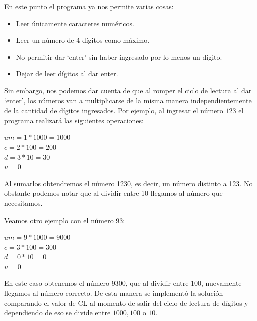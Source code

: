 \documentclass[letter,12 pt,titlepage]{article}
\begin{document}
    En este punto el programa ya nos permite varias cosas:
    \begin{itemize}
        \item Leer únicamente caracteres numéricos.
        \item Leer un número de 4 dígitos como máximo.
        \item No permitir dar `enter' sin haber ingresado por lo menos un dígito.
        \item Dejar de leer dígitos al dar enter.
    \end{itemize}

    Sin embargo, nos podemos dar cuenta de que al romper el ciclo de lectura al dar `enter', los números van a multiplicarse de la misma manera independientemente de la cantidad de dígitos ingresados. Por ejemplo, al ingresar el número $123$ el programa realizará las siguientes operaciones:

    \begin{center}
    \begin{minipage}{0.3\linewidth}
        \begin{flushright}
        $um = 1 * 1000 = 1000$\\
        $ c = 2 *  100 =  200$\\
        $ d = 3 *   10 =   30$\\
        $ u = 0 $
        \end{flushright}
    \end{minipage}
    \end{center}

    Al sumarlos obtendremos el número 1230, es decir, un número distinto a 123. No obstante podemos notar que al dividir entre 10 llegamos al número que necesitamos.

    Veamos otro ejemplo con el número 93:

    \begin{center}
    \begin{minipage}{0.3\linewidth}
        \begin{flushright}
        $um = 9 * 1000 = 9000$\\
        $ c = 3 *  100 =  300$\\
        $ d = 0 *   10 =   0$\\
        $ u = 0 $
        \end{flushright}
    \end{minipage}
    \end{center}

    En este caso obtenemos el número 9300, que al dividir entre 100, nuevamente llegamos al número correcto. De esta manera se implementó la solución comparando el valor de CL al momento de salir del ciclo de lectura de dígitos y dependiendo de eso se divide entre $1000,100$ o $10$.
\end{document}
